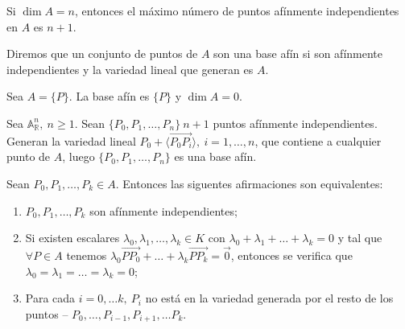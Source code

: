 \documentclass[14pt]{book}
\begin{document}
\begin{obs}
	Si $\dim A = n$, entonces el máximo número de puntos afínmente independientes en $A$ es $n+1$.
\end{obs}

\begin{dfn}
	Diremos que un conjunto de puntos de $A$ son una base afín si son afínmente independientes y la variedad lineal que generan es $A$.
\end{dfn}

\begin{ej}
	Sea $A = \{P\}$. La base afín es $\{P\}$ y $\dim A = 0$.
	
	Sea $\mathbb{A}_\mathbb{R}^n,\ n \geq 1$. Sean $\{P_0, P_1, \dots, P_n \}\  n+1$ puntos afínmente independientes. Generan la variedad lineal $P_0 + \langle\overrightarrow{P_0P_i}\rangle, \ i = 1, \dots, n$, que contiene a cualquier punto de $A$, luego $\{P_0, P_1, \dots, P_n \}$ es una base afín.
\end{ej}

\begin{tm}
	Sean $P_0, P_1, \dots, P_k \in A$. Entonces las siguentes afirmaciones son equivalentes:
	\begin{enumerate}
		\item $P_0, P_1, \dots, P_k$ son afínmente independientes;
		\item Si existen escalares $\lambda_0, \lambda_1, \dots, \lambda_k \in K$ con $\lambda_0 + \lambda_1 + \dots + \lambda_k = 0$ y tal que  $\forall P \in A$ tenemos $\lambda_0\overrightarrow{PP_0} + \dots + \lambda_k\overrightarrow{PP_k} = \overrightarrow{0}$, entonces se verifica que $\lambda_0 = \lambda_1 = \dots = \lambda_k = 0$;
		\item Para cada $i = 0, \dots k,\ P_i$ no está en la variedad generada por el resto de los puntos –  $P_0, \dots, P_{i-1}, P_{i+1}, \dots P_k$.
	\end{enumerate}
\end{tm}
\end{document}
